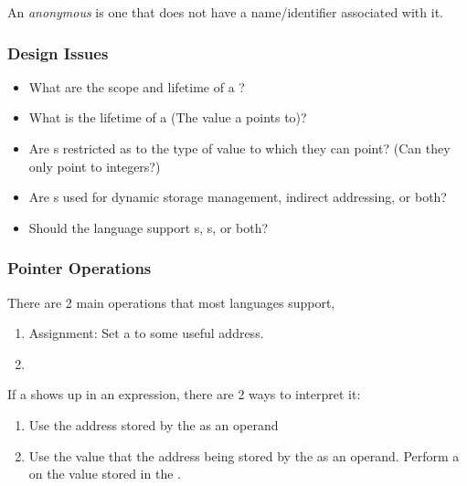 \begin{definition}\label{def:Anonymous_Variable}
  An \emph{anonymous } is one that does not have a name/identifier associated with it.
\end{definition}

\subsubsection{Design Issues}\label{subsubsec:Pointer-Design_Issues}
\begin{itemize}[noitemsep]
\item What are the scope and lifetime of a ?
\item What is the lifetime of a  (The value a  points to)?
\item Are s restricted as to the type of value to which they can point? (Can they only point to integers?)
\item Are s used for dynamic storage management, indirect addressing, or both?
\item Should the language support s, s, or both?
\end{itemize}

\subsubsection{Pointer Operations}\label{subsubsec:Pointer-Operations}
There are 2 main operations that most languages support,
\begin{enumerate}[noitemsep]
\item Assignment: Set a    to some useful address.
\item {}
\end{enumerate}

If a  shows up in an expression, there are 2 ways to interpret it:
\begin{enumerate}[noitemsep]
\item Use the address stored by the  as an operand
\item Use the value that the address being stored by the  as an operand. Perform a  on the value stored in the .
\end{enumerate}

